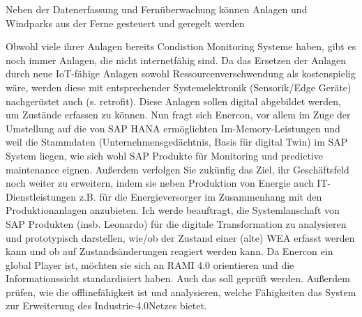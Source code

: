 Neben der Datenerfassung und Fernüberwachung können Anlagen und Windparks aus der Ferne gesteuert und geregelt werden


 Obwohl viele ihrer Anlagen bereits Condistion Monitoring Systeme haben, gibt es noch immer Anlagen, die nicht internetfähig sind. Da das Ersetzen der Anlagen durch neue IoT-fähige Anlagen sowohl Ressourcenverschwendung als kostenspielig wäre, werden diese mit entsprechender Systemelektronik (Sensorik/Edge Geräte) nachgerüstet auch (s. retrofit). Diese Anlagen sollen digital abgebildet werden, um Zustände erfassen zu können. Nun fragt sich Enercon, vor allem im Zuge der Umstellung auf die von SAP HANA ermöglichten Im-Memory-Leistungen und weil die Stammdaten (Unternehmensgedächtnis, Basis für digital Twin) im SAP System liegen, wie sich wohl SAP Produkte für Monitoring und predictive maintenance eignen.
Außerdem verfolgen Sie zukünfig das Ziel, ihr Geschäftsfeld noch weiter zu erweitern, indem sie neben Produktion von Energie auch IT-Dienstleistungen z.B. für die Energieversorger im Zusammenhang mit den Produktionanlagen anzubieten.
Ich werde beauftragt, die Systemlanschaft von SAP Produkten (insb. Leonardo) für die digitale Transformation zu analysieren und prototypisch darstellen, wie/ob der Zustand einer (alte) WEA erfasst werden kann und ob auf Zustandsänderungen reagiert werden kann. Da Enercon ein global Player ist, möchten sie sich an RAMI 4.0 orientieren und die Informationssicht standardisiert haben. Auch das soll geprüft werden. Außerdem prüfen, wie die offlinefähigkeit ist und analysieren, welche Fähigkeiten das System zur Erweiterung des Industrie-4.0Netzes bietet.


